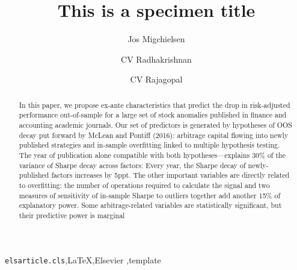\documentclass[3p,12pt,times,authoryear]{elsarticle}
\begin{document}
	\begin{frontmatter}
		\title{This is a specimen title }
		\author[1]{Jos Migchielsen %
			}
		\author[2]{CV Radhakrishnan }
		\author[3]{CV Rajagopal }
		\address[1]{Elsevier B.V., Radarweg 29, 1043 NX Amsterdam,
			The Netherlands}
		\address[2]{Sayahna Foundations, JWRA 34, Jagathy,
			Trivandrum 695014, India}
		\address[3]{STM Document Engineering Pvt Ltd., Mepukada,
			Malayinkil, Trivandrum 695571, India}
		\begin{abstract}
			In this paper, we propose ex-ante characteristics that predict the drop in risk-adjusted performance
			out-of-sample for a large set of stock anomalies published in finance and accounting
			academic journals. Our set of predictors is generated by hypotheses of OOS decay put forward
			by McLean and Pontiff (2016): arbitrage capital flowing into newly published strategies and
			in-sample overfitting linked to multiple hypothesis testing. The year of publication alone
			compatible with both hypotheses—explains 30\% of the variance of Sharpe decay across factors:
			Every year, the Sharpe decay of newly-published factors increases by 5ppt. The other
			important variables are directly related to overfitting: the number of operations required to
			calculate the signal and two measures of sensitivity of in-sample Sharpe to outliers together
			add another 15\% of explanatory power. Some arbitrage-related variables are statistically significant,
			but their predictive power is marginal
		\end{abstract}
		\begin{keyword}
			\texttt{elsarticle.cls}\sep \LaTeX\sep Elsevier \sep template
		\end{keyword}
	\end{frontmatter}
\end{document}
